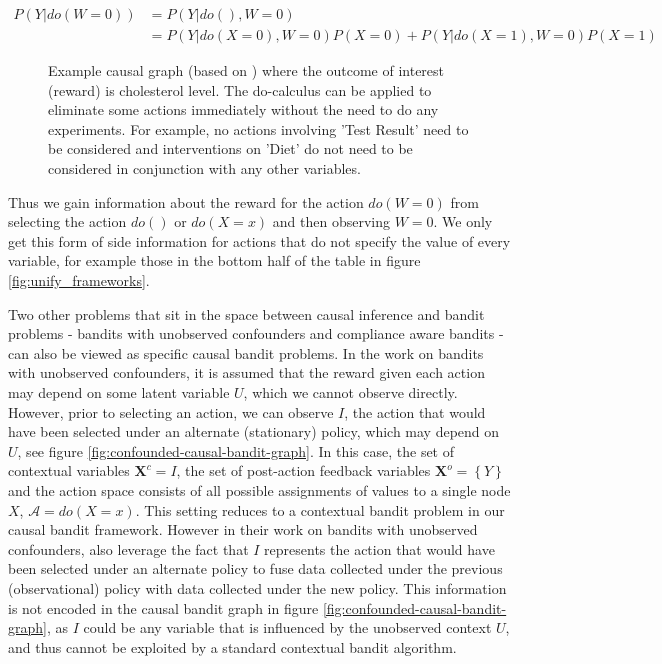 \documentclass[11pt,a4paper,twoside]{report}
\newcommand{\actionspace}{\mathcal{A}}
\newcommand{\set}[1]{\left\{#1\right\}}
\newcommand{\eq}[1]{\begin{align*}#1\end{align*}}
\renewcommand{\vec}[1]{\boldsymbol{#1}}
\theoremstyle{plain}
\theoremstyle{definition}
\begin{document}
\eq{
P(Y|do(W = 0)) &= P(Y|do(),W = 0) \\
&= P(Y|do(X=0),W=0)P(X=0)+P(Y|do(X=1),W=0)P(X=1) 
}

\begin{figure}
\centering
{}
\caption{Example causal graph (based on \citet{Koller2009}) where the outcome of interest (reward) is cholesterol level. The do-calculus can be applied to eliminate some actions immediately without the need to do any experiments. For example, no actions involving 'Test Result' need to be considered and interventions on 'Diet' do not need to be considered in conjunction with any other variables.}
\label{fig:cholesterol_graph}
\end{figure}

Thus we gain information about the reward for the action $do(W=0)$ from selecting the action $do()$ or $do(X = x)$ and then observing $W = 0$.  We only get this form of side information for actions that do not specify the value of every variable, for example those in the bottom half of the table in figure \ref{fig:unify_frameworks}. 

Two other problems that sit in the space between causal inference and bandit problems - bandits with unobserved confounders \cite{Bareinboim2015} and compliance aware bandits  \citep{DellaPenna2016} - can also be viewed as specific causal bandit problems. In the work on bandits with unobserved confounders, it is assumed that the reward given each action may depend on some latent variable $U$, which we cannot observe directly. However, prior to selecting an action, we can observe  $I$, the action that would have been selected under an alternate (stationary) policy, which may depend on $U$, see figure \ref{fig:confounded-causal-bandit-graph}. In this case, the set of contextual variables $\vec{X}^c = I$, the set of post-action feedback variables $\vec{X}^o = \set{Y}$ and the action space consists of all possible assignments of values to a single node $X$, $\actionspace = do(X=x)$. This setting reduces to a contextual bandit problem in our causal bandit framework. However in their work on bandits with unobserved confounders, \citet{Forney2017} also leverage the fact that $I$ represents the action that would have been selected under an alternate policy to fuse data collected under the previous (observational) policy with data collected under the new policy. This information is not encoded in the causal bandit graph in figure \ref{fig:confounded-causal-bandit-graph}, as $I$ could be any variable that is influenced by the unobserved context $U$, and thus cannot be exploited by a standard contextual bandit algorithm. 
\end{document}

